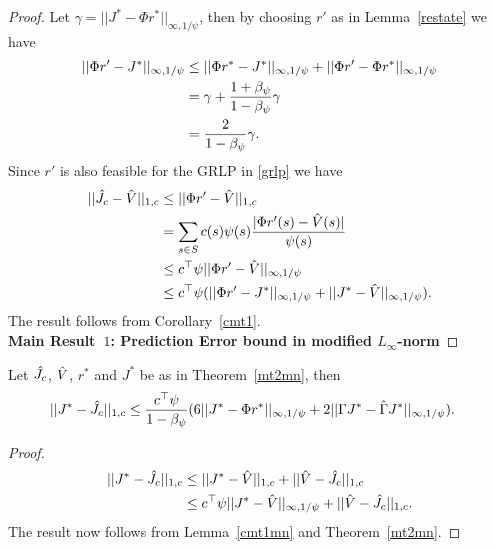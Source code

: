 \begin{proof}
Let $\gamma=||J^*-\Phi r^*||_{\infty,1/\psi}$, then by choosing $r'$ as in Lemma~\ref{restate} we have
\begin{align}
||\Phi r'-J^*||_{\infty,1/\psi}&\leq ||\Phi r^*-J^*||_{\infty,1/\psi}+||\Phi r'-\Phi r^*||_{\infty,1/\psi}\nonumber\\
&=\gamma+\frac{1+\beta_\psi}{1-\beta_\psi}\gamma\nonumber\\
&=\frac{2}{1-\beta_\psi}\gamma.\nonumber
\end{align}
Since $r'$ is also feasible for the GRLP in \eqref{grlp} we have
\begin{align}
||\hat{J}_c-\hat{V}||_{1,c}&\leq||\Phi r'-\hat{V}||_{1,c}\nonumber\\
&=\sum_{s\in S}c(s)\psi(s)\frac{|\Phi r'(s)-\hat{V}(s)|}{\psi(s)}\nonumber\\
&\leq c^\top \psi ||\Phi r'-\hat{V}||_{\infty,1/\psi}\nonumber\\
&\leq c^\top \psi (||\Phi r'-J^*||_{\infty,1/\psi}+||J^*-\hat{V}||_{\infty,1/\psi}).
\end{align}
The result follows from Corollary~\ref{cmt1}.\\
\textbf{Main Result~$1$: Prediction Error bound in modified $L_\infty$-norm}
\end{proof}
\begin{theorem}\label{cmt2mn}
Let $\hat{J}_c$, $\hat{V}$, $r^*$ and $J^*$ be as in Theorem~\ref{mt2mn}, then
\begin{align}\label{finalbndmn}
||J^*-\hat{J}_c||_{1,c}&\leq\frac{c^\top\psi}{1-\beta_\psi}(6 ||J^*-\Phi r^*||_{\infty,1/\psi}
+2||\Gamma J^*-\hat{\Gamma} J^*||_{\infty,1/\psi}).
\end{align}
\end{theorem}
\begin{proof}
\begin{align}
||J^*-\hat{J}_c||_{1,c}&\leq||J^*-\hat{V}||_{1,c}+||\hat{V}-\hat{J}_c||_{1,c}\nonumber\\
&\leq c^\top \psi ||J^*-\hat{V}||_{\infty,1/\psi}+||\hat{V}-\hat{J}_c||_{1,c}.\nonumber
\end{align}
The result now follows from Lemma~\ref{cmt1mn} and Theorem~\ref{mt2mn}.
\end{proof}\\
